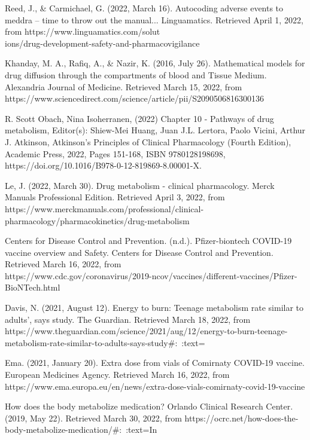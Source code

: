 \documentclass{article}
\begin{document}
Reed, J., & Carmichael, G. (2022, March 16). Autocoding adverse events to meddra – time to throw out the manual... Linguamatics. Retrieved April 1, 2022, from https://www.linguamatics.com/solut\\ions/drug-development-safety-and-pharmacovigilance 

 Khanday, M. A., Rafiq, A., & Nazir, K. (2016, July 26). Mathematical models for drug diffusion through the compartments of blood and Tissue Medium. Alexandria Journal of Medicine. Retrieved March 15, 2022, from https://www.sciencedirect.com/science/article/pii/S2090506816300136 

R. Scott Obach, Nina Isoherranen, (2022) Chapter 10 - Pathways of drug metabolism, Editor(s): Shiew-Mei Huang, Juan J.L. Lertora, Paolo Vicini, Arthur J. Atkinson, Atkinson's Principles of Clinical Pharmacology (Fourth Edition), Academic Press, 2022, Pages 151-168, ISBN 9780128198698, https://doi.org/10.1016/B978-0-12-819869-8.00001-X.

Le, J. (2022, March 30). Drug metabolism - clinical pharmacology. Merck Manuals Professional Edition. Retrieved April 3, 2022, from https://www.merckmanuals.com/professional/clinical-pharmacology/pharmacokinetics/drug-metabolism 

Centers for Disease Control and Prevention. (n.d.). Pfizer-biontech COVID-19 vaccine overview and Safety. Centers for Disease Control and Prevention. Retrieved March 16, 2022, from\\ https://www.cdc.gov/coronavirus/2019-ncov/vaccines/different-vaccines/Pfizer-BioNTech.html 

Davis, N. (2021, August 12). Energy to burn: Teenage metabolism rate similar to adults', says study. The Guardian. Retrieved March 18, 2022, from \\https://www.theguardian.com/science/2021/aug/12/energy-to-burn-teenage-metabolism-rate-similar-to-adults-says-study#:~:text=%

Ema. (2021, January 20). Extra dose from vials of Comirnaty COVID-19 vaccine. European Medicines Agency. Retrieved March 16, 2022, from https://www.ema.europa.eu/en/news/extra-dose-vials-comirnaty-covid-19-vaccine 

How does the body metabolize medication? Orlando Clinical Research Center. (2019, May 22). Retrieved March 30, 2022, from https://ocrc.net/how-does-the-body-metabolize-medication/#:~:text=In%
\end{document}

